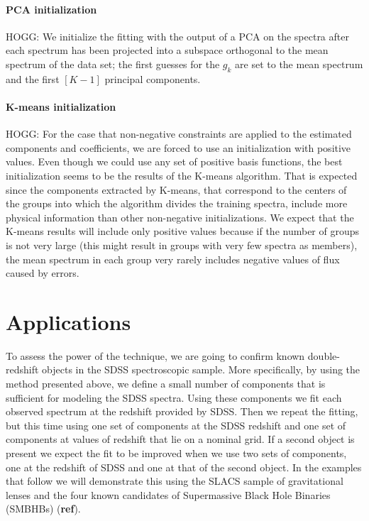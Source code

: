 \documentclass[12pt,preprint]{aastex}
\begin{document}
\paragraph{PCA initialization}
HOGG: We initialize the fitting with the output of a PCA on the
spectra after each spectrum has been projected into a subspace
orthogonal to the mean spectrum of the data set; the first guesses for
the $g_{k}$ are set to the mean spectrum and the first $[K-1]$
principal components.

\paragraph{K-means initialization}
HOGG: For the case that non-negative constraints are applied to the
estimated components and coefficients, we are forced to use an
initialization with positive values. Even though we could use any set
of positive basis functions, the best initialization seems to be the
results of the K-means algorithm. That is expected since the
components extracted by K-means, that correspond to the centers of the
groups into which the algorithm divides the training spectra, include
more physical information than other non-negative initializations. We
expect that the K-means results will include only positive values
because if the number of groups is not very large (this might result
in groups with very few spectra as members), the mean spectrum in each
group very rarely includes negative values of flux caused by errors.

\section{Applications}\label{sec:applications}
To assess the power of the technique, we are going to confirm known
double-redshift objects in the SDSS spectroscopic sample. More
specifically, by using the method presented above, we define a small
number of components that is sufficient for modeling the SDSS
spectra. Using these components we fit each observed spectrum at the
redshift provided by SDSS. Then we repeat the fitting, but this time
using one set of components at the SDSS redshift and one set of
components at values of redshift that lie on a nominal grid. If a
second object is present we expect the fit to be improved when we use
two sets of components, one at the redshift of SDSS and one at that of
the second object. In the examples that follow we will demonstrate
this using the SLACS sample of gravitational lenses \citep{bolton} and
the four known candidates of Supermassive Black Hole Binaries (SMBHBs)
(\textbf{ref}).
\end{document}
